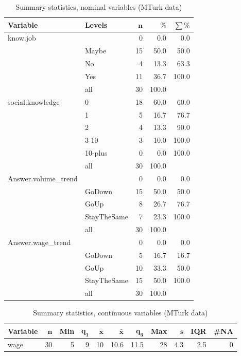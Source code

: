 \documentclass[a4paper,10pt]{article}\usepackage[]{graphicx}\usepackage[]{color}
\begin{document}
\begin{table}[ht]
\centering
{\footnotesize
\begin{tabular}{ll|rrr}
 \textbf{Variable} & \textbf{Levels} & $\mathbf{n}$ & $\mathbf{\%}$ & $\mathbf{\sum \%}$ \\ 
  \hline
know.job &  & 0 & 0.0 & 0.0 \\ 
   & Maybe & 15 & 50.0 & 50.0 \\ 
   & No & 4 & 13.3 & 63.3 \\ 
   & Yes & 11 & 36.7 & 100.0 \\ 
   \hline
 & all & 30 & 100.0 &  \\ 
   \hline
\hline
social.knowledge & 0 & 18 & 60.0 & 60.0 \\ 
   & 1 & 5 & 16.7 & 76.7 \\ 
   & 2 & 4 & 13.3 & 90.0 \\ 
   & 3-10 & 3 & 10.0 & 100.0 \\ 
   & 10-plus & 0 & 0.0 & 100.0 \\ 
   \hline
 & all & 30 & 100.0 &  \\ 
   \hline
\hline
Answer.volume\_trend &  & 0 & 0.0 & 0.0 \\ 
   & GoDown & 15 & 50.0 & 50.0 \\ 
   & GoUp & 8 & 26.7 & 76.7 \\ 
   & StayTheSame & 7 & 23.3 & 100.0 \\ 
   \hline
 & all & 30 & 100.0 &  \\ 
   \hline
\hline
Answer.wage\_trend &  & 0 & 0.0 & 0.0 \\ 
   & GoDown & 5 & 16.7 & 16.7 \\ 
   & GoUp & 10 & 33.3 & 50.0 \\ 
   & StayTheSame & 15 & 50.0 & 100.0 \\ 
   \hline
 & all & 30 & 100.0 &  \\ 
   \hline
\hline
\end{tabular}
}
\caption{Summary statistics, nominal variables (MTurk data)} 
\label{tab1:51-9190}
\end{table}
\begin{table}[ht]
\centering
{\footnotesize
\begin{tabular}{lrrrrrrrrrr}
 \textbf{Variable} & $\mathbf{n}$ & \textbf{Min} & $\mathbf{q_1}$ & $\mathbf{\widetilde{x}}$ & $\mathbf{\bar{x}}$ & $\mathbf{q_3}$ & \textbf{Max} & $\mathbf{s}$ & \textbf{IQR} & \textbf{\#NA} \\ 
  \hline
wage & 30 & 5 & 9 & 10 & 10.6 & 11.5 & 28 & 4.3 & 2.5 & 0 \\ 
  \end{tabular}
}
\caption{Summary statistics, continuous variables (MTurk data)} 
\label{tab2:51-9190}
\end{table}
\end{document}

